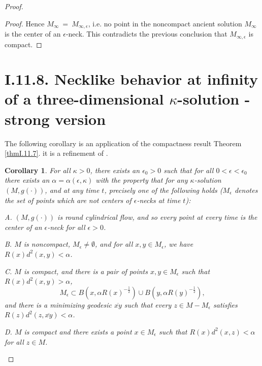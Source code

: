 \documentclass[12pt]{amsart}
\newcommand{\al}{\alpha}
\newcommand{\eps}{\epsilon}
\newcommand{\ol}{\overline}
\numberwithin{equation}{section}
\theoremstyle{plain}
\newtheorem{corollary}[equation]{Corollary}
\theoremstyle{definition}
\theoremstyle{remark}
\begin{document}
\begin{proof}
\begin{proof}
Hence $M_\infty \: = \: M_{\infty,\epsilon}$, i.e. no point in the
noncompact ancient solution $M_\infty$ is the center of an $\epsilon$-neck.
This contradicts the previous conclusion that 
$M_{\infty,\epsilon}$ is compact.
\end{proof}

\section{I.11.8. Necklike behavior at infinity of a three-dimensional
$\kappa$-solution - strong version}
\label{strongversion}

The following corollary is an application of the compactness result
Theorem \ref{thmI.11.7}.  
it is a refinement of 
\cite[Cor. I.11.8]{Perelman}.

\begin{corollary}
\label{neckstructure}
For all $\kappa>0$, there exists an $\eps_0>0$ such that 
for all $0<\eps<\eps_0$ there exists an $\al=\al(\eps,\kappa)$
with the property that for  any $\kappa$-solution $(M,g(\cdot))$,
and at any time $t$, precisely one of the following holds
($M_\eps$ denotes the set of points which are not centers of $\eps$-necks
at time $t$):

A.  $(M,g(\cdot))$ is round cylindrical flow, and 
so every point at every time is the center of an $\eps$-neck for all
$\eps>0$.

B.  $M$ is noncompact, $M_\eps\neq\emptyset$, and for
all $x,y\in M_\eps$, we have $R(x)d^2(x,y)<\al$.

C.  $M$ is compact, and there is a pair of points
$x,y\in M_\eps$ such that $R(x)d^2(x,y)>\al$,
\begin{equation}
M_\eps\subset B(x,\al R(x)^{-\frac{1}{2}})\cup 
B(y,\al R(y)^{-\frac{1}{2}}),
\end{equation}
and there is a minimizing geodesic $\ol{xy}$ such that
every $z\in M - M_\eps$ satisfies $R(z)d^2(z,\ol{xy})<\al$.

D. $M$ is compact and there exists a point $x\in M_\eps$
such that $R(x)d^2(x,z)<\al$ for all $z\in M$.
\end{corollary}



\end{proof}
\end{document}
